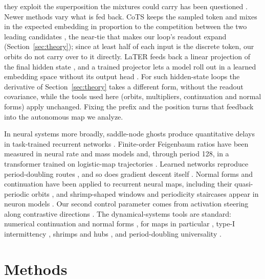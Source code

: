 \documentclass[11pt,letterpaper]{article}
\begin{document}
they exploit the superposition the mixtures could carry has been questioned \cite{rizvimartel2026illusion}.
Newer methods vary what is fed back. CoTS keeps the sampled token and mixes in the expected embedding in
proportion to the competition between the two leading candidates \cite{yu2026cots}, the near-tie that makes our
loop's readout expand (Section~\ref{sec:theory}); since at least half of each input is the discrete token, our
orbits do not carry over to it directly. LaTER feeds back a linear projection of the final hidden state
\cite{li2026later}, and a trained projector lets a model roll out in a learned embedding space without its
output head \cite{koriagin2026nohead}. For such hidden-state loops the derivative of Section~\ref{sec:theory}
takes a different form, without the readout covariance, while the tools used here (orbits, multipliers,
continuation and normal forms) apply unchanged. Fixing
the prefix and the position turns that feedback into the autonomous map we analyze.

In neural systems more broadly, saddle-node ghosts produce quantitative delays in task-trained recurrent networks
\cite{dinc2026ghost}. Finite-order Feigenbaum ratios have been measured in neural rate and mass models
\cite{battaglia2007temporal,papasavvas2015gain} and, through period 128, in a transformer trained on logistic-map
trajectories \cite{liu2026learningchaos}. Learned networks reproduce period-doubling routes \cite{kim2021teaching},
and so does gradient descent itself \cite{kalra2025universal}. Normal forms and continuation have been applied to
recurrent neural maps, including their quasi-periodic orbits \cite{marichal2015multiple}, and shrimp-shaped windows and periodicity staircases appear in
neuron models \cite{gomez2014universal,stenzinger2025shrimp,caixeta2025staircase}. Our second control parameter comes
from activation steering along contrastive directions \cite{zou2023representation,zhang2025steering}. The
dynamical-systems tools are standard: numerical continuation and normal forms
\cite{kuznetsov2023elements,govaerts2000numerical}, for maps in particular \cite{kuznetsov2019maps}, type-I intermittency \cite{pomeau1980intermittent}, shrimps and
hubs \cite{gallas1993structure,facanha2013endoskeletons,vitolo2011hubs,jones2012rossler}, and period-doubling universality
\cite{feigenbaum1978quantitative}.

\section{Methods}
\label{sec:methods}
\end{document}

